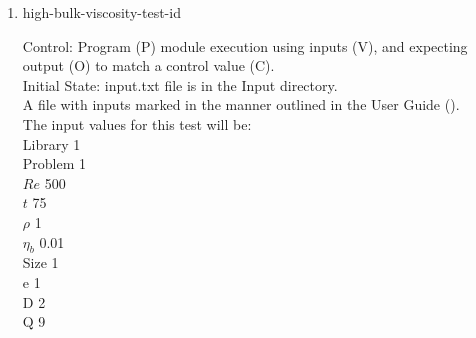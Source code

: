 \documentclass[12pt, titlepage]{article}
\newcommand{\famname}{Lattice Boltzmann Solver}
\newcounter{testcounter} %
\begin{document}
\begin{enumerate}
Output: Vorticity vector values printed to the screen.  \\

Test Case Derivation: This case is a comparison with the pseudo-oracle
pyLBM. The C values of this test for pyLBM can be found in the file
id9output.txt located in the OracleOutput folder. The output values of {\famname} will be compared to the pseudo-oracle output values.\\
This test covers the low bound for bulk viscosity.\\
		
How test will be performed: 

\begin{enumerate}
\item The Von Karman Vortex Street module shall be modified by the author to
  print the vorticity vector as output.
\item Outside of the system, the input parameter values will be written to a text file titled input.txt, as outlined in the User Guide.
\item The file will be placed into the Input directory, under the home directory of the project.
\item {\famname} shall be run.
\item Upon completion of the module, the output values of the vorticity vector
  will be compared to the vorticity vector values from pyLBM - comparison will
  be done per cell. Comparisons can be done manually using Excel, or through a
  script, using the equation for relative error found in Section \ref{eqerror}.
\end{enumerate}

\item{high-bulk-viscosity-test-id\thetestcounter \\}

Control: Program (P) module execution using inputs (V), and expecting output (O) to match a control value (C).\\
					
Initial State: input.txt file is in the Input directory.\\
					
A file with inputs marked in the manner outlined in the User
Guide (\citet{LBM_UserGuide_PM}).\\The input values for this test will be:\\
  Library 1\\
Problem 1\\
$Re$ 500\\
$t$ 75\\
$\rho$ 1\\
$\eta_b$ 0.01\\
Size 1\\
$\mathrm{e}$ 1\\
$\mathrm{D}$ 2\\
$\mathrm{Q}$ 9\\


\end{enumerate}
\end{document}
